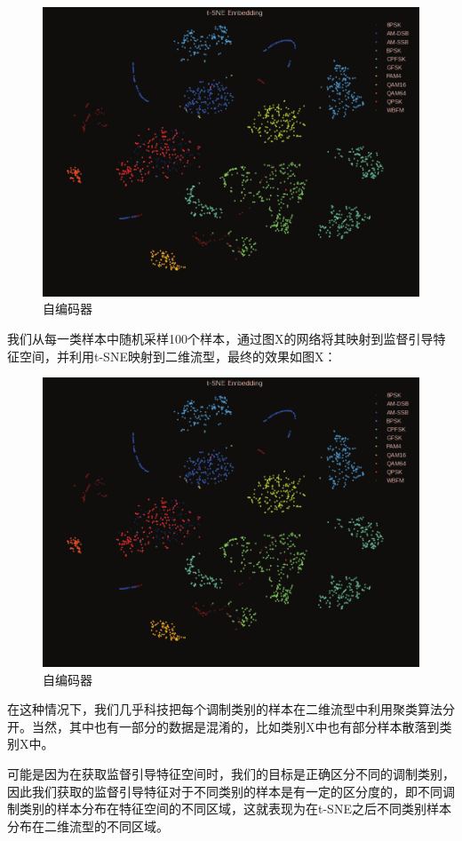 \begin{figure}[!h]
	\centering
	\includegraphics[scale=0.2]{figures/chapter_3/surprised_fea}
	\caption{自编码器}	\label{fig_3_6}
\end{figure}

我们从每一类样本中随机采样100个样本，通过图X的网络将其映射到监督引导特征空间，并利用t-SNE映射到二维流型，最终的效果如图X：

\begin{figure}[!h]
	\centering
	\includegraphics[scale=0.2]{figures/chapter_3/surprised_fea}
	\caption{自编码器}
\end{figure}

在这种情况下，我们几乎科技把每个调制类别的样本在二维流型中利用聚类算法分开。当然，其中也有一部分的数据是混淆的，比如类别X中也有部分样本散落到类别X中。\par
可能是因为在获取监督引导特征空间时，我们的目标是正确区分不同的调制类别，因此我们获取的监督引导特征对于不同类别的样本是有一定的区分度的，即不同调制类别的样本分布在特征空间的不同区域，这就表现为在t-SNE之后不同类别样本分布在二维流型的不同区域。\par

